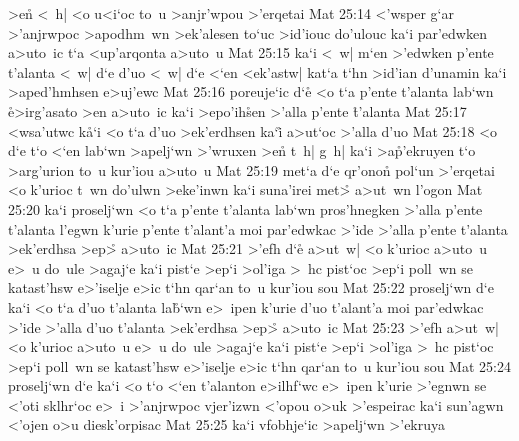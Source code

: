 >en\r{}
<~h|
<o
u<i`oc
to~u
>anjr'wpou
>'erqetai\bibvsend
\vs Mat 25:14
<'wsper
g`ar
>'anjrwpoc
>apodhm~wn
>ek'alesen
to`uc
>id'iouc
do'ulouc
ka`i
par'edwken
a>uto~ic
t`a
<up'arqonta
a>uto~u\bibvsend
\vs Mat 25:15
ka`i
<~w|
m`en
>'edwken
p'ente
t'alanta
<~w|
d`e
d'uo
<~w|
d`e
<`en
<ek'astw|
kat`a
t`hn
>id'ian
d'unamin
ka`i
>aped'hmhsen
e>uj'ewc\bibvsend
\vs Mat 25:16
poreuje`ic
d`e\r{}
<o
t`a
p'ente
t'alanta
lab`wn
\r{e}>irg'asato
>en
a>uto~ic
ka`i
>epo'ih\r{s}en
>'alla
p'ente
\r{t}'alanta\bibvsend
{}
\vs Mat 25:17
<wsa'utwc
k\r{a}`i
<o
t`a
d'uo
>ek'erdhsen
ka`i\r{}
a>ut`oc
>'alla
d'uo\bibvsend
\vs Mat 25:18
<o
d`e
t`o
<`en
lab`wn
>apelj`wn
>'wruxen
>en\r{}
t~h|
g~h|
ka`i
>a\r{p}'ekruyen
t`o
>arg'urion
to~u
kur'iou
a>uto~u\bibvsend
\vs Mat 25:19
met`a
d`e
qr'onon\r{}
pol`un
>'erqetai
<o
k'urioc
t~wn
do'ulwn
>eke'inwn
ka`i
suna'irei
met>\r{}
a>ut~wn
l'ogon\bibvsend
\vs Mat 25:20
ka`i
proselj`wn
<o
t`a
p'ente
t'alanta
lab`wn
pros'hnegken
>'alla
p'ente
t'alanta
l'egwn
k'urie
p'ente
t'alant'a
moi
par'edwkac
>'ide
>'alla
p'ente
t'alanta
>ek'erdhsa
>ep>\r{}
a>uto~ic\bibvsend
\vs Mat 25:21
>'efh
d`e\r{}
a>ut~w|
<o
k'urioc
a>uto~u
e>~u
do~ule
>agaj`e
ka`i
pist`e
>ep`i
>ol'iga
>~hc
pist`oc
>ep`i
poll~wn
se
katast'hsw
e>'iselje
e>ic
t`hn
qar`an
to~u
kur'iou
sou\bibvsend
\vs Mat 25:22
proselj`wn
d`e
ka`i
<o
t`a
d'uo
t'alanta
la\r{b}`wn
e>~ipen
k'urie
d'uo
t'alant'a
moi
par'edwkac
>'ide
>'alla
d'uo
t'alanta
>ek'erdhsa
>ep>\r{}
a>uto~ic\bibvsend
\vs Mat 25:23
>'efh
a>ut~w|
<o
k'urioc
a>uto~u
e>~u
do~ule
>agaj`e
ka`i
pist`e
>ep`i
>ol'iga
>~hc
pist`oc
>ep`i
poll~wn
se
katast'hsw
e>'iselje
e>ic
t`hn
qar`an
to~u
kur'iou
sou\bibvsend
\vs Mat 25:24
proselj`wn
d`e
ka`i
<o
t`o
<`en
t'alanton
e>ilhf`wc
e>~ipen
k'urie
>'egnwn
se
<'oti
sklhr`oc
e>~i
>'anjrwpoc
vjer'izwn
<'opou
o>uk
>'espeirac
ka`i
sun'agwn
<'ojen
o>u
diesk'orpisac\bibvsend
\vs Mat 25:25
ka`i
vfobhje`ic
>apelj`wn
>'ekruya

